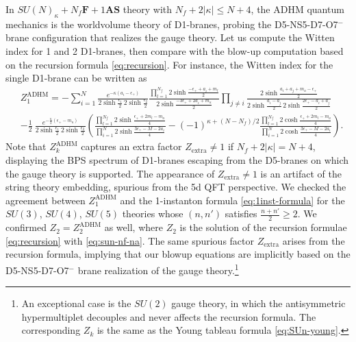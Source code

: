\documentclass[letterpaper, 11pt]{article}
\newcommand{\nn}{\nonumber}
\def\e{\epsilon}
\def\k{\kappa}
\begin{document}
{In $SU(N)_\kappa + N_f\mathbf{F} + 1\mathbf{AS}$ theory with $N_f + 2|\kappa| \leq N+4$, the ADHM quantum mechanics is the worldvolume theory of D1-branes, probing the D5-NS5-D7-O7${}^{-}$ brane configuration that realizes the gauge theory. Let us compute the Witten index for 1 and 2 D1-branes, then compare with the blow-up computation based on the recursion formula \eqref{eq:recursion}. For instance, the Witten index for the single D1-brane can be written as
\begin{align}
  &Z_1^\text{ADHM} = - \sum_{i=1}^N \frac{e^{-\k (a_i - \e_+)}}{2\sinh{\frac{\e_1}{2}}\,2\sinh{\frac{\e_2}{2}}} \frac{\prod_{l=1}^{N_f}2\sinh{\frac{-\e_+ + a_i + m_l}{2}}}{2\sinh{\frac{-3\e_+ + 2a_i + m_a}{2}}} \prod_{j \neq i}\frac{2\sinh{\frac{a_i + a_j + m_a - \e_+}{2}}}{2\sinh{ \frac{a_{i}-a_j}{2}}\, 2\sinh{\frac{2\e_+ - a_i + a_j}{2}}} \nn \\
  &- \frac{1}{2}\ \frac{e^{-\frac{\k}{2}(\e_+ - m_a)}}{2\sinh{\frac{\e_1}{2}}\,2\sinh{\frac{\e_2}{2}}} \left(\frac{\prod_{l=1}^{N_f} 2\sinh{\frac{\e_+ + 2m_l - m_a}{4}}}{\prod_{i=1}^N 2\sinh{\frac{3\e_+ - M - 2a_i}{4}}} - (-1)^{\k + (N-N_f)/2}\frac{\prod_{l=1}^{N_f} 2\cosh{\frac{\e_+ + 2m_l - m_a}{4}}}{\prod_{i=1}^N 2\cosh{\frac{3\e_+ - M - 2a_i}{4}}}\right).
\end{align}
Note that $Z_k^\text{ADHM}$ captures an extra factor $Z_\text{extra} \neq 1$ if $N_f + 2|\k| = N+4$, displaying the BPS spectrum of  D1-branes escaping from the D5-branes on which the gauge theory is supported. 
The appearance of $Z_\text{extra}\neq 1$ is an artifact of the string theory embedding, spurious from the 5d QFT perspective.
We checked the agreement between $Z_1^\text{ADHM}$ and the 1-instanton formula \eqref{eq:1inst-formula} for the $SU(3)$, $SU(4)$, $SU(5)$ theories whose  $(n,n')$ satisfies $\frac{n+n'}{2} \geq 2$. We confirmed 
$Z_2 = Z_2^\text{ADHM}$ as well, where $Z_2$ is the solution of the recursion formulae \eqref{eq:recursion} with \eqref{eq:sun-nf-na}. The same spurious factor $Z_\text{extra}$ arises from the recursion formula, implying that our blowup equations are implicitly based on the D5-NS5-D7-O7${}^{-}$ brane realization of the gauge theory.\footnote{An exceptional case is the $SU(2)$ gauge theory, in which the antisymmetric hypermultiplet decouples and never affects the recursion formula. The corresponding $Z_k$ is the same as the Young tableau formula \eqref{eq:SUn-young}.}

}
\end{document}
